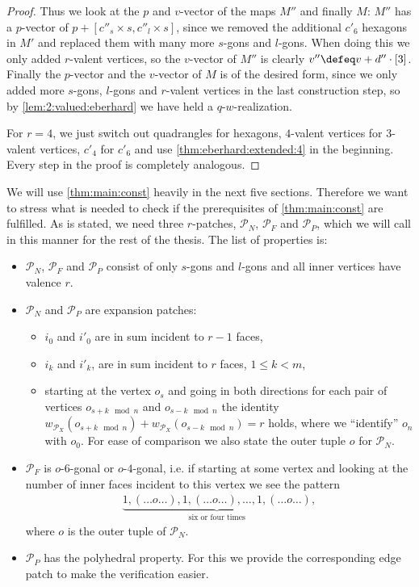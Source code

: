 \begin{proposition}
\begin{proof}
    Thus we look at the $p$ and $v$-vector of the maps $M''$ and finally $M$: $M''$ has a $p$-vector of $p + [c''_s \times s, c''_l \times s]$, since we removed the additional $c'_6$ hexagons in $M'$ and replaced them with many more $s$-gons and $l$-gons. When doing this we only added $r$-valent vertices, so the $v$-vector of $M''$ is clearly $v'' \defeq v + d'' \cdot [3]$. Finally the $p$-vector and the $v$-vector of $M$ is of the desired form, since we only added more $s$-gons, $l$-gons and $r$-valent vertices in the last construction step, so by \autoref{lem:2:valued:eberhard} we have held a $q$-$w$-realization. 

    For $r = 4$, we just switch out quadrangles for hexagons, $4$-valent vertices for $3$-valent vertices, $c'_4$ for $c'_6$ and use \autoref{thm:eberhard:extended:4} in the beginning. Every step in the proof is completely analogous.
  \end{proof}
\end{proposition}

\begin{remark}
  We will use \autoref{thm:main:const} heavily in the next five sections. Therefore we want to stress what is needed to check if the prerequisites of \autoref{thm:main:const} are fulfilled. As is stated, we need three $r$-patches, $\mathcal{P}_N$, $\mathcal{P}_F$ and $\mathcal{P}_P$, which we will call in this manner for the rest of the thesis. The list of properties is:
  \begin{itemize}
    \item $\mathcal{P}_N$, $\mathcal{P}_F$ and $\mathcal{P}_P$ consist of only $s$-gons and $l$-gons and all inner vertices have valence $r$.
    \item $\mathcal{P}_N$ and $\mathcal{P}_P$ are expansion patches:
      \begin{itemize}
      \item $i_0$ and $i'_0$ are in sum incident to $r-1$ faces,
      \item $i_k$ and $i'_k$, are in sum incident to $r$ faces, $1 \leq k < m$,
      \item starting at the vertex $o_s$ and going in both directions for each pair of vertices $o_{s+k \mod n}$ and $o_{s-k \mod n}$ the identity $w_{\mathcal{P}_X}(o_{s+k \mod n}) + w_{\mathcal{P}_X}(o_{s-k \mod n}) = r$ holds, where we ``identify'' $o_n$ with $o_0$. For ease of comparison we also state the outer tuple $o$ for $\mathcal{P}_N$. 
      \end{itemize}
    \item $\mathcal{P}_F$ is $o$-$6$-gonal or $o$-$4$-gonal, i.e. if starting at some vertex and looking at the number of inner faces incident to this vertex we see the pattern
      \begin{align*}
        \underbrace{1, (\dots o \dots), 1, (\dots o \dots), \dots, 1, (\dots o \dots)}_{\text{six or four times}},
      \end{align*}
      where $o$ is the outer tuple of $\mathcal{P}_N$.
    \item $\mathcal{P}_P$ has the polyhedral property. For this we provide the corresponding edge patch to make the verification easier.
 \end{itemize}
\end{remark}